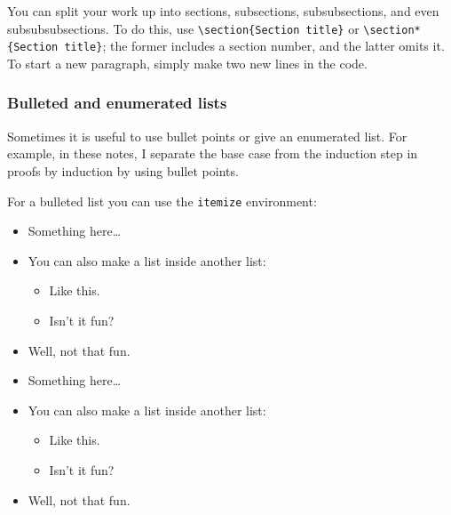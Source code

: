 You can split your work up into sections, subsections, subsubsections, and even subsubsubsections. To do this, use \lstinline|\section{Section title}| or \lstinline|\section*{Section title}|; the former includes a section number, and the latter omits it. To start a new paragraph, simply make two new lines in the code.

\subsubsection*{Bulleted and enumerated lists}

Sometimes it is useful to use bullet points or give an enumerated list. For example, in these notes, I separate the base case from the induction step in proofs by induction by using bullet points.

For a bulleted list you can use the \lstinline|itemize| environment:

\begin{texcodeleft}
\begin{itemize}
\item Something here\dots
\item You can also make a list inside another list:
  \begin{itemize}
  \item Like this.
  \item Isn't it fun?
  \end{itemize}
\item Well, not that fun.
\end{itemize}
\end{texcodeleft}
%
\begin{texcoderight}
\begin{itemize}
\item Something here\dots
\item You can also make a list inside another list:
  \begin{itemize}
  \item Like this.
  \item Isn't it fun?
  \end{itemize}
\item Well, not that fun.
\end{itemize}
\end{texcoderight}

